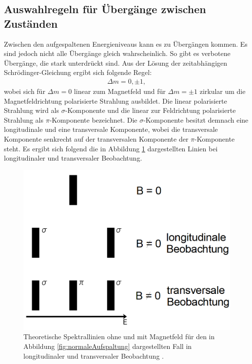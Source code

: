 \subsection{Auswahlregeln für Übergänge zwischen Zuständen}
Zwischen den aufgespaltenen Energieniveaus kann es zu Übergängen kommen. Es sind jedoch nicht alle Übergänge gleich wahrscheinlich. So gibt es verbotene Übergänge, die stark unterdrückt sind. Aus der Lösung der zeitabhängigen Schrödinger-Gleichung ergibt sich folgende Regel: 
\begin{gather*}
	\Delta m =0, \pm 1,
\end{gather*}
wobei sich für $\Delta m=0$ linear zum Magnetfeld und für $\Delta m=\pm 1$ zirkular um die Magnetfeldrichtung polarisierte Strahlung ausbildet. Die linear polarisierte Strahlung wird als $\sigma$-Komponente und die linear zur Feldrichtung polarisierte Strahlung als $\pi$-Komponente bezeichnet. Die $\sigma$-Komponente besitzt demnach eine longitudinale und eine transversale Komponente, wobei die transversale Komponente senkrecht auf der transversalen Komponente der $\pi$-Komponente steht. Es ergibt sich folgend die in Abbildung \ref{fig:linien} dargestellten Linien bei longitudinaler und transversaler Beobachtung.
\begin{figure}
	\centering
	\includegraphics[width=\linewidth-150pt,height=\textheight-150pt,keepaspectratio]{content/Images/linien.png}
    \caption{Theoretische Spektrallinien ohne und mit Magnetfeld für den in Abbildung \ref{fig:normaleAufspaltung} dargestellten Fall in longitudinaler und transversaler Beobachtung \cite{V27}.}
    \label{fig:linien}
\end{figure}


